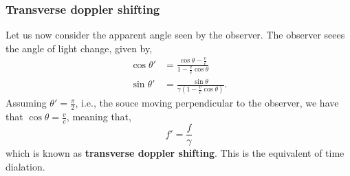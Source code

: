 \documentclass{book}
\begin{document}
\subsubsection{Transverse doppler shifting}
Let us now consider the apparent angle seen by the observer. The observer seees the angle of light change, given by,
\begin{align}
	\cos\theta' & = \frac{\cos\theta - \frac{v}{c}}{1 - \frac{v}{c}\cos\theta} \label{cosrelation} \\
	\sin\theta' & = \frac{\sin\theta}{\gamma\left(1 - \frac{v}{c}\cos\theta\right)}.
\end{align}
Assuming $\theta' = \frac{\pi}{2}$, i.e., the souce moving perpendicular to the observer, we have that $\cos\theta = \frac{v}{c}$, meaning that,
\begin{equation}
	f' = \frac{f}{\gamma}
\end{equation}
which is known as \textbf{transverse doppler shifting}. This is the equivalent of time dialation.
\end{document}
